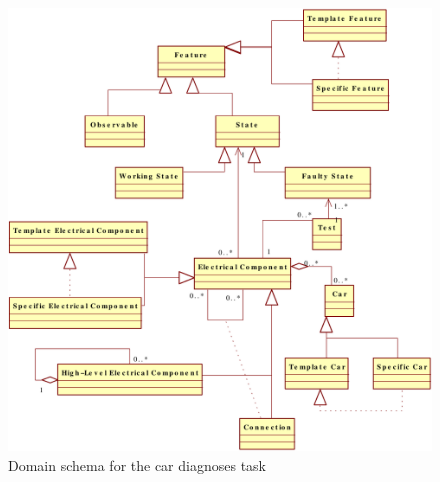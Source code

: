 \documentclass[a4paper,10pt]{article}
\begin{document}
\begin{figure}[htbp]
	\centering
		\includegraphics[width=1.00\textwidth]{domainSchema.pdf}
	\caption{Domain schema for the car diagnoses task}
	\label{fig:DS}
\end{figure}
\end{document}
